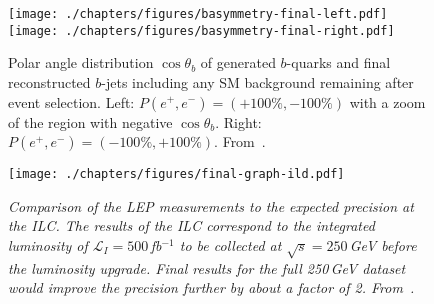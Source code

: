 \begin{figure*}
       \texttt{[image: ./chapters/figures/basymmetry-final-left.pdf]}
        \hspace{0.2cm}       
        \texttt{[image: ./chapters/figures/basymmetry-final-right.pdf]}
	\caption{Polar angle distribution $\cos{\theta_b}$ of generated $b$-quarks and final reconstructed 
         $b$-jets including any SM  background remaining after event selection. 
         Left:  $P(e^+,e^-)=(+100\%,-100\%)$ with a zoom of the region with negative 
         $\cos{\theta_b}$.
         Right: $P(e^+,e^-)=(-100\%,+100\%)$. From~\cite{Bilokin:2017lco}.  }
	\label{fig:ffbar_basym}
\end{figure*}


\begin{figure}
	\centering
	\texttt{[image: ./chapters/figures/final-graph-ild.pdf]}
	\caption{\sl  Comparison of the LEP measurements to the expected 
                  precision at the ILC. The results of the ILC correspond to the 
                  integrated luminosity of $\mathcal{L}_I = 500$\,fb$^{-1}$ to be collected 
                   at $\sqrt{s} = 250$\,GeV before the luminosity upgrade. Final results for the
                  full 250\,GeV dataset would improve the precision further by about a factor of 2.
                   From~\cite{Bilokin:2017lco}.}
	\label{fig:LEPILCResult_3}
\end{figure}
